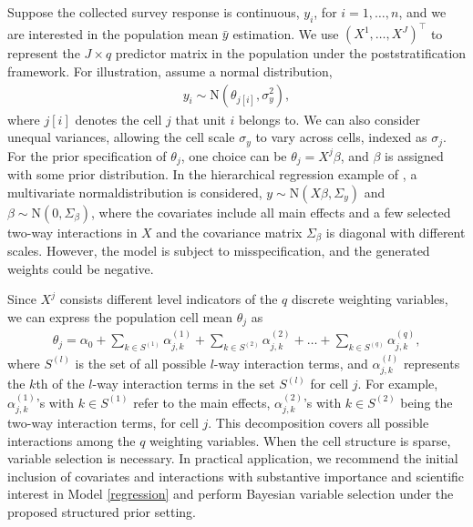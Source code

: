 \documentclass[11pt]{article}
\numberwithin{figure}{section}
\numberwithin{table}{section}
\numberwithin{equation}{section}
\begin{document}
Suppose the collected survey response is continuous, $y_i$, for $i=1,\dots, n$,
and we are interested in the population mean $\bar{y}$ estimation. We use
$(X^1,\dots, X^J)^\top$ to represent the $J\times q$ predictor matrix in the
population under the poststratification framework. For illustration, assume a
normal distribution, \begin{align} \label{normal} y_i \sim
\textrm{N}(\theta_{j[i]}, \sigma_y^2), \end{align} where $j[i]$ denotes the
cell $j$ that unit $i$ belongs to. We can also consider unequal variances,
allowing the cell scale $\sigma_y$ to vary across cells, indexed as $\sigma_j$.
For the prior specification of $\theta_j$, one choice can be
$\theta_j=X^j\beta$, and $\beta$ is assigned with some prior distribution. In
the hierarchical regression example of \cite{gelman07}, a multivariate
normaldistribution is considered, $y\sim \textrm{N}(X\beta, \Sigma_{y})$ and
$\beta \sim \textrm{N}(0,\Sigma_{\beta})$, where the covariates include all
main effects and a few selected two-way interactions in $X$ and the covariance
matrix $\Sigma_{\beta}$ is diagonal with different scales. However, the model
is subject to misspecification, and the generated weights could be negative.
	
Since $X^j$ consists different level indicators of the $q$ discrete weighting
variables, we can express the population cell mean $\theta_j$ as \begin{align}
  \label{regression} \theta_j=\alpha_0 + \sum_{k\in
  S^{(1)}}\alpha_{j,k}^{(1)}+\sum_{k\in
  S^{(2)}}\alpha_{j,k}^{(2)}+\dots+\sum_{k\in S^{(q)}}\alpha_{j,k}^{(q)},
  \end{align} where $S^{(l)}$ is the set of all possible $l$-way interaction
  terms, and $\alpha^{(l)}_{j,k}$ represents the $k$th of the $l$-way
  interaction terms in the set $S^{(l)}$ for cell $j$. For example,
  $\alpha^{(1)}_{j,k}$'s with $k\in S^{(1)}$ refer to the main effects,
  $\alpha^{(2)}_{j,k}$'s with $k\in S^{(2)}$ being the two-way interaction
  terms, for cell $j$. This decomposition covers all possible interactions
  among the $q$ weighting variables. When the cell structure is sparse,
  variable selection is necessary. In practical application, we recommend the
  initial inclusion of covariates and interactions with substantive importance
  and scientific interest in Model \eqref{regression} and perform Bayesian
  variable selection under the proposed structured prior setting.
\end{document}
